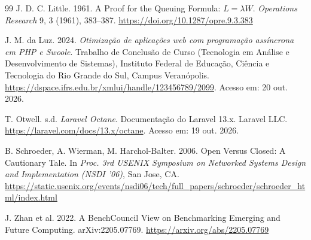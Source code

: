 \documentclass[sigconf, nonacm, screen, language=portuguese, language=spanish, language={main=english}]{acmart}
\begin{document}
\begin{thebibliography}{99}
J. D. C. Little. 1961. A Proof for the Queuing Formula: $L=\lambda W$. \textit{Operations Research} 9, 3 (1961), 383--387. \url{https://doi.org/10.1287/opre.9.3.383}

J. M. da Luz. 2024. \textit{Otimização de aplicações web com programação assíncrona em PHP e Swoole}. Trabalho de Conclusão de Curso (Tecnologia em Análise e Desenvolvimento de Sistemas), Instituto Federal de Educação, Ciência e Tecnologia do Rio Grande do Sul, Campus Veranópolis. \url{https://dspace.ifrs.edu.br/xmlui/handle/123456789/2099}. Acesso em: 20 out. 2026.

T. Otwell. s.d. \textit{Laravel Octane}. Documentação do Laravel 13.x. Laravel LLC. \url{https://laravel.com/docs/13.x/octane}. Acesso em: 19 out. 2026.

B. Schroeder, A. Wierman, M. Harchol-Balter. 2006. Open Versus Closed: A Cautionary Tale. In \textit{Proc. 3rd USENIX Symposium on Networked Systems Design and Implementation (NSDI '06)}, San Jose, CA. \url{https://static.usenix.org/events/nsdi06/tech/full_papers/schroeder/schroeder_html/index.html}

J. Zhan et al. 2022. A BenchCouncil View on Benchmarking Emerging and Future Computing. arXiv:2205.07769. \url{https://arxiv.org/abs/2205.07769}

\end{thebibliography}
\end{document}
